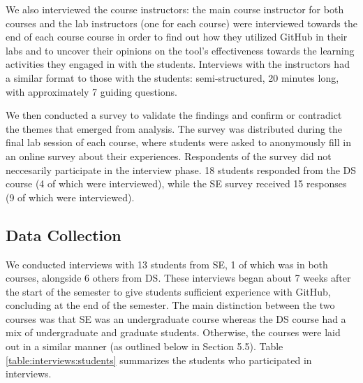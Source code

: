 We also interviewed the course instructors: the main course instructor for both courses and the lab instructors (one for each course) were interviewed towards the end of each course course in order to find out how they utilized GitHub in their labs and to uncover their opinions on the tool's effectiveness towards the learning activities they engaged in with the students. Interviews with the instructors had a similar format to those with the students: semi-structured, 20 minutes long, with approximately 7 guiding questions.

We then conducted a survey to validate the findings and confirm or contradict the themes that emerged from analysis. The survey was distributed during the final lab session of each course, where students were asked to anonymously fill in an online survey about their experiences. Respondents of the survey did not neccesarily participate in the interview phase. 18 students responded from the DS course (4 of which were interviewed), while the SE survey received 15 responses (9 of which were interviewed).

\subsection{Data Collection}
We conducted interviews with 13 students from SE, 1 of which was in both courses, alongside 6 others from DS. These interviews began about 7 weeks after the start of the semester to give students sufficient experience with GitHub, concluding at the end of the semester. The main distinction between the two courses was that SE was an undergraduate course whereas the DS course had a mix of undergraduate and graduate students. Otherwise, the courses were laid out in a similar manner (as outlined below in Section 5.5). Table \ref{table:interviews:students} summarizes the students who participated in interviews.

